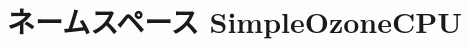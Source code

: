 \hypertarget{namespaceSimpleOzoneCPU}{
\section{ネームスペース SimpleOzoneCPU}
\label{namespaceSimpleOzoneCPU}
}
